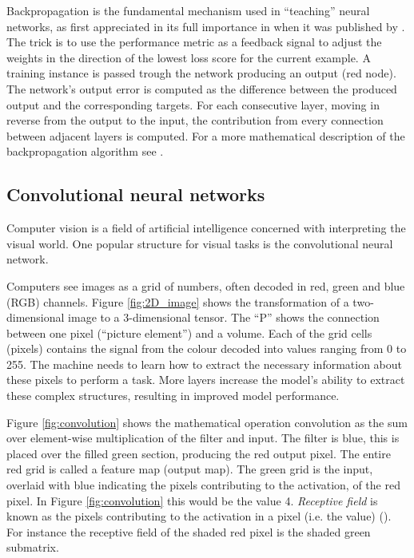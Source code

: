 Backpropagation is the fundamental mechanism used in ``teaching'' neural networks, as first appreciated in its full importance in \citeyear{RumelhartBackProp} when it was published by \citeauthor{RumelhartBackProp}. The trick is to use the performance metric as a feedback signal to adjust the weights in the direction of the lowest loss score for the current example. A training instance is passed trough the network producing an output (red node). The network's output error is computed as the difference between the produced output and the corresponding targets. For each consecutive layer, moving in reverse from the output to the input, the contribution from every connection between adjacent layers is computed.
For a more mathematical description of the backpropagation algorithm see \cite{nielsen_back_prop}.

\subsection{Convolutional neural networks} \label{sec:convolutional neural network}
Computer vision is a field of artificial intelligence concerned with interpreting the visual world. One popular structure for visual tasks is the convolutional neural network. %

Computers see images as a grid of numbers, often decoded in red, green and blue (RGB) channels. Figure \ref{fig:2D_image} shows the transformation of a two-dimensional image to a 3-dimensional tensor. The ``P'' shows the connection between one pixel (``picture element'') and a volume. Each of the grid cells (pixels) contains the signal from the colour decoded into values ranging from 0 to 255. The machine needs to learn how to extract the necessary information about these pixels to perform a task. More layers increase the model's ability to extract these complex structures, resulting in improved model performance. 

Figure \ref{fig:convolution} shows the mathematical operation convolution as the sum over element-wise multiplication of the filter and input. The filter is blue, this is placed over the filled green section, producing the red output pixel. The entire red grid is called a feature map (output map). The green grid is the input, overlaid with blue indicating the pixels contributing to the activation, of the red pixel. In Figure \ref{fig:convolution} this would be the value 4. \textit{Receptive field} is known as the pixels contributing to the activation in a pixel (i.e. the value) (\cite{Luo2016UnderstandingNetworks}). For instance the receptive field of the shaded red pixel is the shaded green submatrix.

